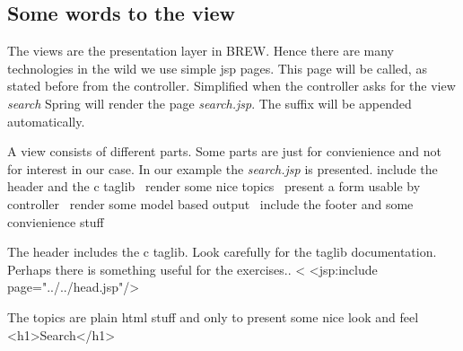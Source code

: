 \documentclass{llncs}%
\begin{document}
\subsection{Some words to the view}
The views are the presentation layer in BREW. Hence there are many technologies in the wild we use simple jsp pages. This page will be called, as stated before from the controller. Simplified when the controller asks for the view {\em search} Spring will render the page {\em search.jsp}. The suffix will be appended automatically.

A view consists of different parts. Some parts are just for convienience and not for interest in our case. In our example the {\em search.jsp} is presented.
\nwenddocs{}\endmoddef\nwstartdeflinemarkup\nwenddeflinemarkup
\LA{}include the header and the c taglib~{\nwtagstyle{}}\RA{}
\LA{}render some nice topics~{\nwtagstyle{}}\RA{}
\LA{}present a form usable by controller~{\nwtagstyle{}}\RA{}
\LA{}render some model based output~{\nwtagstyle{}}\RA{}
\LA{}include the footer and some convienience stuff~{\nwtagstyle{}}\RA{}
\nwendcode{}\nwdocspar

The header includes the c taglib. Look carefully for the taglib documentation. Perhaps there is something useful for the exercises..
\nwenddocs{}\endmoddef\nwstartdeflinemarkup{}\nwenddeflinemarkup
<%
<jsp:include page="../../head.jsp"/>
\nwendcode{}\nwdocspar

The topics are plain html stuff and only to present some nice look and feel
\nwenddocs{}\endmoddef\nwstartdeflinemarkup{}\nwenddeflinemarkup
<h1>Search</h1>
\end{document}
